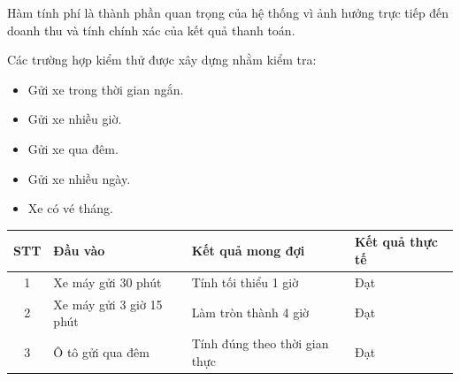 Hàm tính phí là thành phần quan trọng của hệ thống vì ảnh hưởng
trực tiếp đến doanh thu và tính chính xác của kết quả thanh toán.

Các trường hợp kiểm thử được xây dựng nhằm kiểm tra:

\begin{itemize}
    \item Gửi xe trong thời gian ngắn.
    \item Gửi xe nhiều giờ.
    \item Gửi xe qua đêm.
    \item Gửi xe nhiều ngày.
    \item Xe có vé tháng.
\end{itemize}

\begin{table}[htbp]
    \centering
    \begin{tabular}{@{}clll@{}}
        \toprule
        \textbf{STT} &
        \textbf{Đầu vào} &
        \textbf{Kết quả mong đợi} &
        \textbf{Kết quả thực tế} \\
        \midrule
        1 & Xe máy gửi 30 phút
          & Tính tối thiểu 1 giờ
          & Đạt \\

        2 & Xe máy gửi 3 giờ 15 phút
          & Làm tròn thành 4 giờ
          & Đạt \\

        3 & Ô tô gửi qua đêm
          & Tính đúng theo thời gian thực
          & Đạt \\
    \end{tabular}
\end{table}

        
